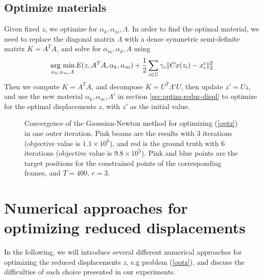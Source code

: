 \documentclass[9pt,twocolumn]{extarticle}
\newcommand{\argmin}{\operatornamewithlimits{arg\ min}}
\begin{document}
\subsection{Optimize materials}\label{sec:optimize-materials}
Given fixed $z$, we optimize for $\alpha_k,\alpha_m,\Lambda$. In order to find
the optimal material, we need to replace the diagonal matrix $\Lambda$ with a
dense symmetric semi-definite matrix $K=A^TA$, and solve for $\alpha_m,\alpha_k,
A$ using
\begin{equation}\label{opt_k}
  \argmin_{\alpha_k,\alpha_m,A} E(z,A^TA,\alpha_k,\alpha_m)+
  \frac{1}{2}\sum_{i\in \mathbb{C}}\gamma_c\|Cx(z_i)-{x}_i^c\|_{2}^2
\end{equation}
Then we compute $K=A^TA$, and decompose $K=U^T\Lambda'U$, then update $z'=Uz$,
and use the new material $\alpha_k,\alpha_m,\Lambda'$ in section
\ref{sec:optim-reduc-displ} to optimize for the optimal displacements $z$, with
$z'$ as the initial value.

\begin{figure}
  \centering
  \caption{Convergence of the Gaussian-Newton method for optimizing (\ref{optz})
    in one outer iteration. Pink beams are the results with 3 iterations
    (objective value is $1.1\times 10^6$), and red is the ground truth with 6
    iterations (objective value is $9.8\times 10^5$). Pink and blue points are
    the target positions for the constrained points of the corresponding frames,
    and $T=400$, $r=3$. }
  \label{f_rlst_gn}
\end{figure}

\section{Numerical approaches for optimizing reduced
  displacements}\label{sec:numer-appr-optim}
In the following, we will introduce several different numerical approaches for
optimizing the reduced displacements $z$, e.g problem (\ref{optz}), and discuss
the difficulties of each choice presented in our experiments.
\end{document}
